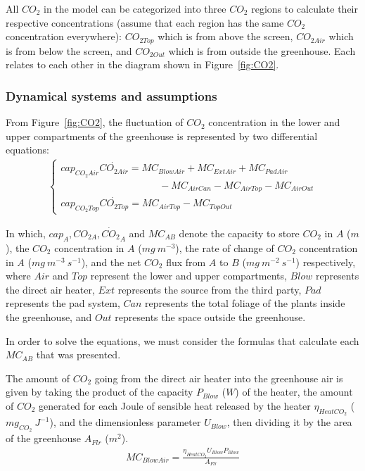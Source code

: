 \documentclass[a4paper]{article}
\numberwithin{equation}{section}
\begin{document}
All \(CO_2\) in the model can be categorized into three \(CO_2\) regions to calculate their respective concentrations (assume that each region has the same \(CO_2\) concentration everywhere): \(CO_{2Top}\) which is from above the screen, \(CO_{2Air}\) which is from below the screen, and \(CO_{2Out}\) which is from outside the greenhouse.
Each relates to each other in the diagram shown in Figure~\ref{fig:CO2}.

\subsubsection{Dynamical systems and assumptions}
From Figure~\ref{fig:CO2}, the fluctuation of \(CO_2\) concentration in the lower and upper compartments of the greenhouse is represented by two differential equations:
\begin{align}
  \begin{cases}
    cap_{CO_2Air}\dot{CO_{2Air}} = MC_{BlowAir} + MC_{ExtAir} + MC_{PadAir} \\ \qquad \qquad \qquad \qquad \qquad
    - MC_{AirCan} - MC_{AirTop} - MC_{AirOut}                               \\
    cap_{CO_2Top}\dot{CO_{2Top}} = MC_{AirTop} - MC_{TopOut}
  \end{cases}
\end{align}

In which, \(cap_A, CO_{2 A}, \dot{CO_2}_A\) and \(MC_{AB}\) denote the capacity to store \(CO_2\) in \(A\) (\(m\)), the \(CO_2\) concentration in \(A\) (\(mg\ m^{-3}\)), the rate of change of \(CO_2\) concentration in \(A\) (\(mg\ m^{-3}\ s^{-1}\)), and the net \(CO_2\) flux from \(A\) to \(B\) (\(mg\ m^{-2}\ s^{-1}\)) respectively, where \(Air\) and \(Top\) represent the lower and upper compartments, \(Blow\) represents the direct air heater, \(Ext\) represents the source from the third party, \(Pad\) represents the pad system, \(Can\) represents the total foliage of the plants inside the greenhouse, and \(Out\) represents the space outside the greenhouse.

In order to solve the equations, we must consider the formulas that calculate each \(MC_{AB}\) that was presented.

The amount of \(CO_2\) going from the direct air heater into the greenhouse air is given by taking the product of the capacity \(P_{Blow}\) (\(W\)) of the heater, the amount of \(CO_2\) generated for each Joule of sensible heat released by the heater \(\eta_{HeatCO_2}\) (\(mg_{CO_2}\ J^{-1}\)), and the dimensionless parameter \(U_{Blow}\), then dividing it by the area of the greenhouse \(A_{Flr}\) (\(m^2\)).
\begin{align}
  MC_{BlowAir} = \frac{\eta_{HeatCO_2}U_{Blow}P_{Blow}}{A_{Flr}}
\end{align}
\end{document}
